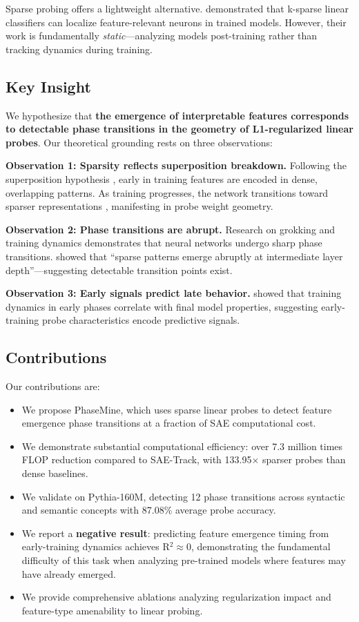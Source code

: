\documentclass{article}
\begin{document}
Sparse probing offers a lightweight alternative. \cite{gurnee2023finding} demonstrated that k-sparse linear classifiers can localize feature-relevant neurons in trained models. However, their work is fundamentally \textit{static}---analyzing models post-training rather than tracking dynamics during training. 

\subsection{Key Insight}

We hypothesize that \textbf{the emergence of interpretable features corresponds to detectable phase transitions in the geometry of L1-regularized linear probes}. Our theoretical grounding rests on three observations:

\textbf{Observation 1: Sparsity reflects superposition breakdown.} Following the superposition hypothesis \cite{elhage2022toy}, early in training features are encoded in dense, overlapping patterns. As training progresses, the network transitions toward sparser representations \cite{robinson2024sparse}, manifesting in probe weight geometry.

\textbf{Observation 2: Phase transitions are abrupt.} Research on grokking and training dynamics \cite{power2022grokking, imani2024grokking} demonstrates that neural networks undergo sharp phase transitions. \cite{robinson2024sparse} showed that ``sparse patterns emerge abruptly at intermediate layer depth''---suggesting detectable transition points exist.

\textbf{Observation 3: Early signals predict late behavior.} \cite{hoogland2024developmental} showed that training dynamics in early phases correlate with final model properties, suggesting early-training probe characteristics encode predictive signals.

\subsection{Contributions}

Our contributions are:
\begin{itemize}
    \item We propose PhaseMine, which uses sparse linear probes to detect feature emergence phase transitions at a fraction of SAE computational cost.
    \item We demonstrate substantial computational efficiency: over 7.3 million times FLOP reduction compared to SAE-Track, with 133.95$\times$ sparser probes than dense baselines.
    \item We validate on Pythia-160M, detecting 12 phase transitions across syntactic and semantic concepts with 87.08\% average probe accuracy.
    \item We report a \textbf{negative result}: predicting feature emergence timing from early-training dynamics achieves R$^2 \approx 0$, demonstrating the fundamental difficulty of this task when analyzing pre-trained models where features may have already emerged.
    \item We provide comprehensive ablations analyzing regularization impact and feature-type amenability to linear probing.
\end{itemize}
\end{document}
